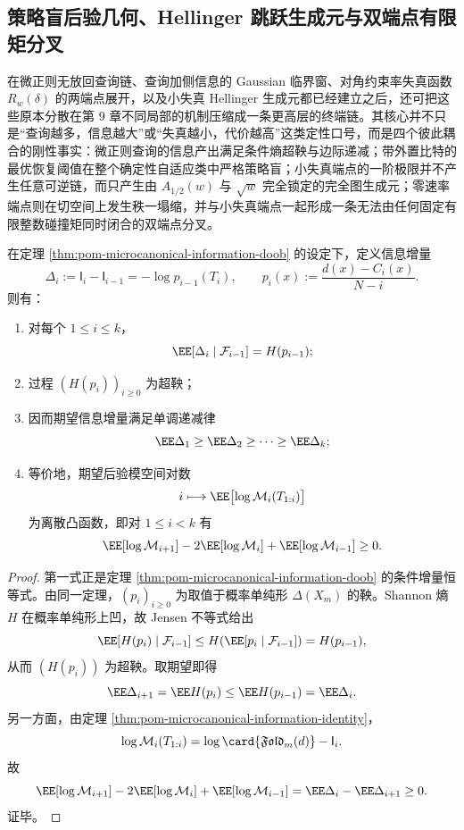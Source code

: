 \subsection{策略盲后验几何、Hellinger 跳跃生成元与双端点有限矩分叉}\label{subsec:conclusion-posterior-hellinger-endpoint-bifurcation}
在微正则无放回查询链、查询加侧信息的 Gaussian 临界窗、对角约束率失真函数 \(R_w(\delta)\) 的两端点展开，以及小失真 Hellinger 生成元都已经建立之后，还可把这些原本分散在第 \(9\) 章不同局部的机制压缩成一条更高层的终端链。其核心并不只是“查询越多，信息越大”或“失真越小，代价越高”这类定性口号，而是四个彼此耦合的刚性事实：微正则查询的信息产出满足条件熵超鞅与边际递减；带外置比特的最优恢复阈值在整个确定性自适应类中严格策略盲；小失真端点的一阶极限并不产生任意可逆链，而只产生由 \(A_{1/2}(w)\) 与 \(\sqrt w\) 完全锁定的完全图生成元；零速率端点则在切空间上发生秩一塌缩，并与小失真端点一起形成一条无法由任何固定有限整数碰撞矩同时闭合的双端点分叉。

\begin{theorem}[微正则查询的信息递减收益律]\label{thm:conclusion-microcanonical-query-diminishing-returns}
在定理 \ref{thm:pom-microcanonical-information-doob} 的设定下，定义信息增量
\[
\Delta_i:=\mathsf I_i-\mathsf I_{i-1}=-\log p_{i-1}(T_i),
\qquad
p_i(x):=\frac{d(x)-C_i(x)}{N-i}.
\]
则有：
\begin{enumerate}
  \item 对每个 \(1\le i\le k\)，
  \[
  \EE[\Delta_i\mid \mathcal F_{i-1}]=H(p_{i-1});
  \]
  \item 过程 \((H(p_i))_{i\ge 0}\) 为超鞅；
  \item 因而期望信息增量满足单调递减律
  \[
  \EE\Delta_1\ge \EE\Delta_2\ge \cdots \ge \EE\Delta_k;
  \]
  \item 等价地，期望后验模空间对数
  \[
  i\longmapsto \EE\bigl[\log \mathcal M_i(T_{1:i})\bigr]
  \]
  为离散凸函数，即对 \(1\le i<k\) 有
  \[
  \EE[\log \mathcal M_{i+1}]-2\EE[\log \mathcal M_i]+\EE[\log \mathcal M_{i-1}]\ge 0.
  \]
\end{enumerate}
\end{theorem}
\begin{proof}
第一式正是定理 \ref{thm:pom-microcanonical-information-doob} 的条件增量恒等式。由同一定理，\((p_i)_{i\ge 0}\) 为取值于概率单纯形 \(\Delta(X_m)\) 的鞅。Shannon 熵 \(H\) 在概率单纯形上凹，故 Jensen 不等式给出
\[
\EE[H(p_i)\mid \mathcal F_{i-1}]
\le
H\!\left(\EE[p_i\mid \mathcal F_{i-1}]\right)
=
H(p_{i-1}),
\]
从而 \((H(p_i))\) 为超鞅。取期望即得
\[
\EE\Delta_{i+1}=\EE H(p_i)\le \EE H(p_{i-1})=\EE\Delta_i.
\]
另一方面，由定理 \ref{thm:pom-microcanonical-information-identity}，
\[
\log \mathcal M_i(T_{1:i})=\log\card{\mathfrak{Fold}_m(d)}-\mathsf I_i.
\]
故
\[
\EE[\log \mathcal M_{i+1}]-2\EE[\log \mathcal M_i]+\EE[\log \mathcal M_{i-1}]
=
\EE\Delta_i-\EE\Delta_{i+1}\ge 0.
\]
证毕。
\end{proof}


